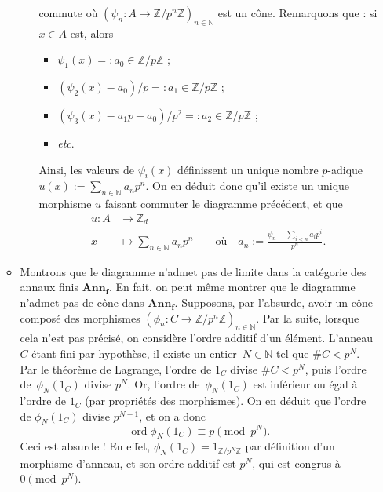 \documentclass{../../td}
\newcommand\ord{\ensuremath{\operatorname{ord}}}
\begin{document}
\begin{enumerate}
\begin{itemize}
\begin{itemize}
\[\begin{tikzcd}
              \end{tikzcd}
              \] commute où $(\psi_n : A \to \mathds{Z} / p^n \mathds{Z})_{n \in \mathds{N}}$ est un cône.
              Remarquons que : si $x \in A$ est, alors
              \begin{itemize}
                \item $\psi_1(x) =: a_0 \in \mathds{Z}/p\mathds{Z}$ ;
                \item $(\psi_2(x) - a_0) / p =: a_1 \in \mathds{Z} / p \mathds{Z}$ ;
                \item $(\psi_3(x) - a_1 p - a_0) / p^2 =: a_2 \in \mathds{Z}/p \mathds{Z}$ ;
                \item \textit{etc}.
              \end{itemize}
              Ainsi, les valeurs de $\psi_i(x)$ définissent un unique nombre $p$-adique $u(x) := \sum_{n \in \mathds{N}}a_n p^n$.
              On en déduit donc qu'il existe un unique morphisme $u$ faisant commuter le diagramme précédent, et que \begin{align*}
                u: A &\longrightarrow \mathds{Z}_d \\
                x &\longmapsto \sum_{n \in \mathds{N}} a_n p^n \quad\quad \text{où} \quad a_n := \frac{\psi_n - \sum_{i < n} a_i p^i}{p^n}
              .\end{align*}
          \end{itemize}
        \item Montrons que le diagramme n'admet pas de limite dans la catégorie des annaux finis $\mathbf{Ann_f}$.
          En fait, on peut même montrer que le diagramme n'admet pas de cône dans $\mathbf{Ann_f}$.
          Supposons, par l'absurde, avoir un cône composé des morphismes $(\phi_n : C \to \mathds{Z} / p^n \mathds{Z})_{n \in \mathds{N}}$.
          Par la suite, lorsque cela n'est pas précisé, on considère l'ordre additif d'un élément.
          L'anneau $C$ étant fini par hypothèse, il existe un entier~$N \in \mathds{N}$ tel que $\# C < p^N$.
          Par le théorème de Lagrange, l'ordre de $1_C$ divise $\# C < p^N$, puis l'ordre de~$\phi_N(1_C)$ divise $p^N$.
          Or, l'ordre de~$\phi_N(1_C)$ est inférieur ou égal à l'ordre de $1_C$ (par propriétés des morphismes).
          On en déduit que l'ordre de $\phi_N(1_C)$ divise $p^{N-1}$, et on a donc \[
            \ord \phi_N(1_C) \equiv p \pmod {p^N}
          .\]
          Ceci est absurde !
          En effet, $\phi_N(1_C) = 1_{\mathds{Z} / p^N \mathds{Z}}$ par définition d'un morphisme d'anneau, et son ordre additif est $p^N$, qui est congrus à $0 \pmod{p^N}$.
      \end{itemize}
  \end{enumerate}
\end{document}
